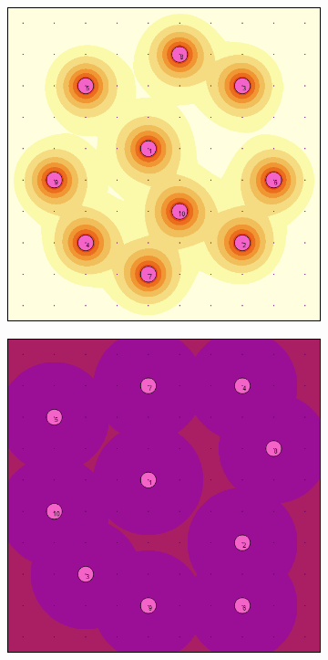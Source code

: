 \documentclass[letterpaper, 10 pt, conference]{ieeeconf}
\begin{document}
\begin{figure}[!h]
\begin{subfigure}[t]{0.3\columnwidth}
    \caption{}
\end{subfigure}%
\hfill
\begin{subfigure}[t]{0.3\columnwidth}
    \centering
    \includegraphics[width=\columnwidth]{Figures/BlankDecay025.png}
    \caption{}
\end{subfigure}%
\hfill
\begin{subfigure}[t]{0.3\columnwidth}
    \centering
    \includegraphics[width=\columnwidth]{Figures/BlankDecay001.png}
    \caption{}
\end{subfigure}%
\caption{}
\label{Fig:BlankDecay}
\end{figure}
\end{document}
